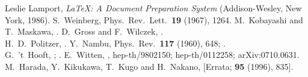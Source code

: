 \documentclass[seceq]{ptptex}
\begin{document}
\begin{thebibliography}{99}
   Leslie Lamport, \textit{LaTeX: A Document Preparation System} 
   (Addison-Wesley, New York, 1986).
   S.~Weinberg, Phys.\ Rev.\ Lett.\ \textbf{19} (1967), 1264.
   M.~Kobayashi and T.~Maskawa, 
   .
   D.~Gross and F.~Wilczek, .\\
   H.~D.~Politzer, .
   Y.~Nambu, Phys.\ Rev.\ \textbf{117} (1960), 648; .\\ 
   G.~'t~Hooft, ; .
   E.~Witten, , hep-th/9802150;
   hep-th/0112258; arXiv:0710.0631.
    M.~Harada, Y.~Kikukawa, T.~Kugo and H.~Nakano,  
    [Errata; \textbf{95} (1996), 835]. 
\end{thebibliography}
\end{document}
